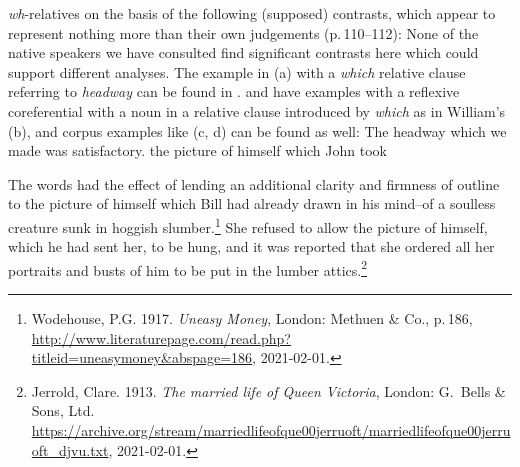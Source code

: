 \documentclass[output=paper
 	        ,biblatex
                ,babelshorthands
                ,newtxmath
                ,draftmode
                ,colorlinks, citecolor=brown
]{langscibook}
\begin{document}
\emph{wh}-relatives on the basis of the following (supposed) contrasts, which appear to represent
nothing more than their own judgements (p.\,110--112):
\eal
{}
\label{ex:min-headway-that}
\label{ex:min-headway-which}
\zl
\eal
{}
\label{ex:min-admire-that}
\label{ex:min-admire-which} 
\zl
\eal
{}
\label{ex:min-picture-that}
\label{ex:min-picture-which} 
\zl
None of the native speakers we have consulted find significant contrasts here which could support
different analyses. The example in (a) with a \emph{which} relative clause referring to \emph{headway} can be found in
.  and  have examples
with a reflexive coreferential with a noun in a relative clause introduced by \emph{which} as in
William's (b), and corpus examples like (c, d) can be found as well:
\ealnoraggedright
\ex The headway which we made was satisfactory.
\ex the picture of himself which John took

\ex The words had the effect of lending an additional clarity and firmness of outline to the picture
    of himself which Bill had already drawn in his mind--of a soulless creature sunk in hoggish
    slumber.\footnote{
      Wodehouse, P.G. 1917. \emph{Uneasy Money}, London: Methuen \& Co., p.\,186,\\
      \url{http://www.literaturepage.com/read.php?titleid=uneasymoney&abspage=186},
      2021-02-01.
}
\ex She refused to allow the 
picture of himself, which he had sent her, to be hung, 
and it was reported that she ordered all her portraits 
and busts of him to be put in the lumber attics.\footnote{
 Jerrold, Clare. 1913. \emph{The married life of Queen Victoria}, London: G.\ Bells \& Sons, Ltd.\\
 \url{https://archive.org/stream/marriedlifeofque00jerruoft/marriedlifeofque00jerruoft_djvu.txt}, 2021-02-01.
}
\end{document}
